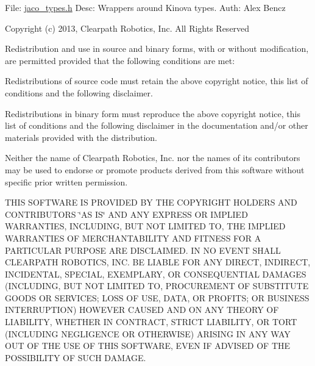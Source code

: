 File\+: \hyperlink{jaco__types_8h}{jaco\+\_\+types.\+h} Desc\+: Wrappers around Kinova types. Auth\+: Alex Bencz

Copyright (c) 2013, Clearpath Robotics, Inc. All Rights Reserved

Redistribution and use in source and binary forms, with or without modification, are permitted provided that the following conditions are met\+:
\begin{DoxyItemize}
\item Redistributions of source code must retain the above copyright notice, this list of conditions and the following disclaimer.
\item Redistributions in binary form must reproduce the above copyright notice, this list of conditions and the following disclaimer in the documentation and/or other materials provided with the distribution.
\item Neither the name of Clearpath Robotics, Inc. nor the names of its contributors may be used to endorse or promote products derived from this software without specific prior written permission.
\end{DoxyItemize}

T\+H\+IS S\+O\+F\+T\+W\+A\+RE IS P\+R\+O\+V\+I\+D\+ED BY T\+HE C\+O\+P\+Y\+R\+I\+G\+HT H\+O\+L\+D\+E\+RS A\+ND C\+O\+N\+T\+R\+I\+B\+U\+T\+O\+RS \char`\"{}\+A\+S I\+S\char`\"{} A\+ND A\+NY E\+X\+P\+R\+E\+SS OR I\+M\+P\+L\+I\+ED W\+A\+R\+R\+A\+N\+T\+I\+ES, I\+N\+C\+L\+U\+D\+I\+NG, B\+UT N\+OT L\+I\+M\+I\+T\+ED TO, T\+HE I\+M\+P\+L\+I\+ED W\+A\+R\+R\+A\+N\+T\+I\+ES OF M\+E\+R\+C\+H\+A\+N\+T\+A\+B\+I\+L\+I\+TY A\+ND F\+I\+T\+N\+E\+SS F\+OR A P\+A\+R\+T\+I\+C\+U\+L\+AR P\+U\+R\+P\+O\+SE A\+RE D\+I\+S\+C\+L\+A\+I\+M\+ED. IN NO E\+V\+E\+NT S\+H\+A\+LL C\+L\+E\+A\+R\+P\+A\+TH R\+O\+B\+O\+T\+I\+CS, I\+NC. BE L\+I\+A\+B\+LE F\+OR A\+NY D\+I\+R\+E\+CT, I\+N\+D\+I\+R\+E\+CT, I\+N\+C\+I\+D\+E\+N\+T\+AL, S\+P\+E\+C\+I\+AL, E\+X\+E\+M\+P\+L\+A\+RY, OR C\+O\+N\+S\+E\+Q\+U\+E\+N\+T\+I\+AL D\+A\+M\+A\+G\+ES (I\+N\+C\+L\+U\+D\+I\+NG, B\+UT N\+OT L\+I\+M\+I\+T\+ED TO, P\+R\+O\+C\+U\+R\+E\+M\+E\+NT OF S\+U\+B\+S\+T\+I\+T\+U\+TE G\+O\+O\+DS OR S\+E\+R\+V\+I\+C\+ES; L\+O\+SS OF U\+SE, D\+A\+TA, OR P\+R\+O\+F\+I\+TS; OR B\+U\+S\+I\+N\+E\+SS I\+N\+T\+E\+R\+R\+U\+P\+T\+I\+ON) H\+O\+W\+E\+V\+ER C\+A\+U\+S\+ED A\+ND ON A\+NY T\+H\+E\+O\+RY OF L\+I\+A\+B\+I\+L\+I\+TY, W\+H\+E\+T\+H\+ER IN C\+O\+N\+T\+R\+A\+CT, S\+T\+R\+I\+CT L\+I\+A\+B\+I\+L\+I\+TY, OR T\+O\+RT (I\+N\+C\+L\+U\+D\+I\+NG N\+E\+G\+L\+I\+G\+E\+N\+CE OR O\+T\+H\+E\+R\+W\+I\+SE) A\+R\+I\+S\+I\+NG IN A\+NY W\+AY O\+UT OF T\+HE U\+SE OF T\+H\+IS S\+O\+F\+T\+W\+A\+RE, E\+V\+EN IF A\+D\+V\+I\+S\+ED OF T\+HE P\+O\+S\+S\+I\+B\+I\+L\+I\+TY OF S\+U\+CH D\+A\+M\+A\+GE.

